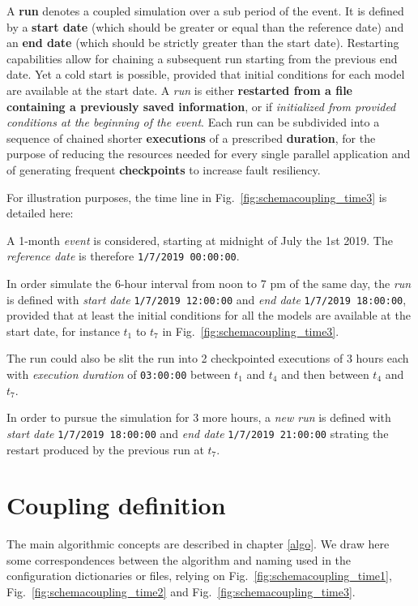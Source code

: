 A {\bf run} denotes a coupled simulation over a sub period
of the event. It is defined by a {\bf start date} (which
should be greater or equal than the reference date) and an
{\bf end date} (which should be strictly greater than the
start date). Restarting capabilities allow for chaining a subsequent
run starting from the previous end date. Yet a cold start is possible, provided that initial conditions for each
model are available at the start date. A {\em run} is either
{\bf restarted from a file containing a
previously saved information}, or if {\em initialized from provided conditions at the beginning of the event}.
Each run can be subdivided into a sequence of chained shorter
{\bf executions} of a prescribed {\bf duration}, for the
purpose of reducing the resources needed for every single parallel
application and of generating frequent {\bf checkpoints}  to
increase fault resiliency.
\newline

For illustration purposes, the time line in Fig.~\ref{fig:schemacoupling_time3} is detailed here:

A 1-month {\em event} is considered, starting at midnight of July the 1st
2019. The {\em reference date} is therefore \texttt{1/7/2019
  00:00:00}.

In order simulate the 6-hour interval from noon to 7 pm of the same day,
the {\em run} is defined with {\em start date} \texttt{1/7/2019
  12:00:00} and {\em end date} \texttt{1/7/2019 18:00:00}, provided
that at least the initial conditions for all the models are available
at the start date, for instance  $t_1$ to $t_7$ in Fig.~\ref{fig:schemacoupling_time3}.

The run could also be slit the run into 2 checkpointed executions of 3
hours each with {\em  execution duration} of
\texttt{03:00:00} between $t_1$ and $t_4$ and then between $t_4$ and $t_7$.

In order to pursue the simulation for 3 more hours, a {\em
  new run} is defined with {\em start date} \texttt{1/7/2019
  18:00:00} and {\em end date} \texttt{1/7/2019 21:00:00} strating
the restart produced by the previous run at $t_7$.

\section{Coupling definition}\label{namcon:COUPLING}
The main algorithmic concepts are described in chapter \ref{algo}. We
draw here some correspondences between the algorithm and naming
 used in the configuration dictionaries or files, relying
on Fig.~\ref{fig:schemacoupling_time1},
Fig.~\ref{fig:schemacoupling_time2} and
Fig.~\ref{fig:schemacoupling_time3}.

